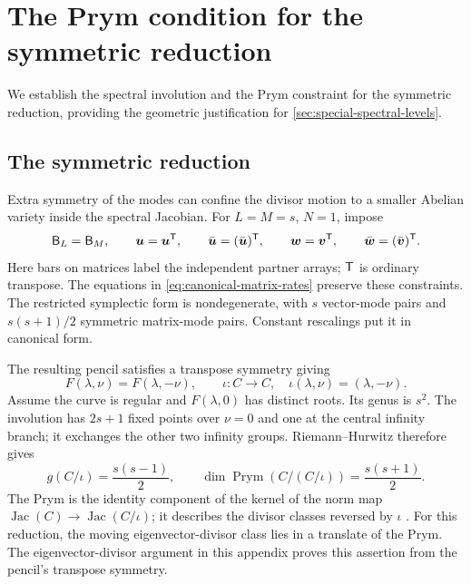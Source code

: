 \section{The Prym condition for the symmetric reduction}
\label{sec:geometry-prym-proof}

We establish the spectral involution and the Prym constraint for the
symmetric reduction, providing the geometric justification for
\cref{sec:special-spectral-levels}.

\subsection{The symmetric reduction}
\label{sec:geometry-prym}

Extra symmetry of the modes can confine the divisor motion to a
smaller Abelian variety inside the spectral Jacobian. For
$L=M=s$, $N=1$, impose
\begin{equation}\label{eq:geometry-fold}
 \mathsf B_L=\mathsf B_M,\qquad
 \boldsymbol u=\boldsymbol u^{\mathsf T},\qquad
 \bar{\boldsymbol u}=(\bar{\boldsymbol u})^{\mathsf T},\qquad
 \boldsymbol w=\boldsymbol v^{\mathsf T},\qquad
 \bar{\boldsymbol w}=(\bar{\boldsymbol v})^{\mathsf T}.
\end{equation}
Here bars on matrices label the independent partner arrays;
$\mathsf T$ is ordinary transpose. The equations in \cref{eq:canonical-matrix-rates}
preserve these constraints. The restricted symplectic form is
nondegenerate, with $s$ vector-mode pairs and $s(s+1)/2$ symmetric
matrix-mode pairs. Constant rescalings put it in canonical form.

The resulting pencil satisfies a transpose symmetry giving
\begin{equation}\label{eq:geometry-involution}
 F(\lambda,\nu)=F(\lambda,-\nu),\qquad
 \iota:C\longrightarrow C,\quad
 \iota(\lambda,\nu)=(\lambda,-\nu).
\end{equation}
Assume the curve is regular and $F(\lambda,0)$ has distinct roots.
Its genus is $s^2$. The involution has $2s+1$ fixed points over
$\nu=0$ and one at the central infinity branch; it exchanges the
other two infinity groups. Riemann--Hurwitz therefore gives
\begin{equation}\label{eq:geometry-prym-dimensions}
 g(C/\iota)=\frac{s(s-1)}2,\qquad
 \dim\operatorname{Prym}(C/(C/\iota))=\frac{s(s+1)}2.
\end{equation}
The Prym is the identity component of the kernel of the norm map
$\operatorname{Jac}(C)\to\operatorname{Jac}(C/\iota)$; it describes
the divisor classes reversed by $\iota$
\cite[\S3.1]{BradlowSchaposnik2016}.
For this reduction, the moving eigenvector-divisor class lies in a
translate of the Prym. The eigenvector-divisor argument in this appendix proves this
assertion from the pencil's transpose symmetry.

